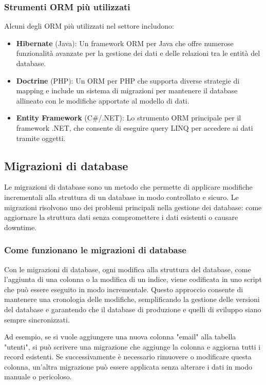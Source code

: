 \subsubsection{Strumenti ORM più utilizzati}
Alcuni degli ORM più utilizzati nel settore includono:
\begin{itemize}
    \item \textbf{Hibernate} (Java): Un framework ORM per Java che offre numerose funzionalità avanzate per la gestione dei dati e delle relazioni tra le entità del database.
    \item \textbf{Doctrine} (PHP): Un ORM per PHP che supporta diverse strategie di mapping e include un sistema di migrazioni per mantenere il database allineato con le modifiche apportate al modello di dati.
    \item \textbf{Entity Framework} (C\#/.NET): Lo strumento ORM principale per il framework .NET, che consente di eseguire query LINQ per accedere ai dati tramite oggetti.
\end{itemize}

\subsection{Migrazioni di database}
Le migrazioni di database sono un metodo che permette di applicare modifiche incrementali alla struttura di un database in modo controllato e sicuro. Le migrazioni risolvono uno dei problemi principali nella gestione dei database: come aggiornare la struttura dati senza compromettere i dati esistenti o causare downtime.

\subsubsection{Come funzionano le migrazioni di database}
Con le migrazioni di database, ogni modifica alla struttura del database, come l'aggiunta di una colonna o la modifica di un indice, viene codificata in uno script che può essere eseguito in modo incrementale. Questo approccio consente di mantenere una cronologia delle modifiche, semplificando la gestione delle versioni del database e garantendo che il database di produzione e quelli di sviluppo siano sempre sincronizzati.

Ad esempio, se si vuole aggiungere una nuova colonna "email" alla tabella "utenti", si può scrivere una migrazione che aggiunge la colonna e aggiorna tutti i record esistenti. Se successivamente è necessario rimuovere o modificare questa colonna, un'altra migrazione può essere applicata senza alterare i dati in modo manuale o pericoloso.

